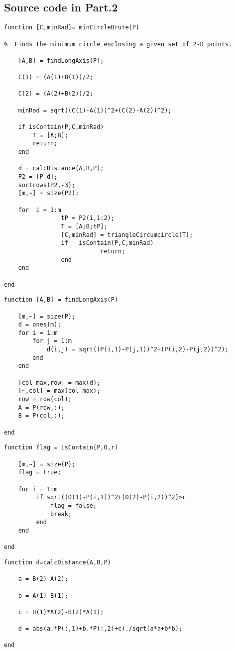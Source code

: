 \documentclass[a4paper, 12pt]{article}
\begin{document}
\subsection{Source code in Part.2}
%
\begin{lstlisting}
function [C,minRad]= minCircleBrute(P)

%  Finds the minimum circle enclosing a given set of 2-D points.

	[A,B] = findLongAxis(P);

	C(1) = (A(1)+B(1))/2;

	C(2) = (A(2)+B(2))/2;

	minRad = sqrt((C(1)-A(1))^2+(C(2)-A(2))^2);

	if isContain(P,C,minRad)
	    T = [A;B];
	    return;
	end

	d = calcDistance(A,B,P);
	P2 = [P d];
	sortrows(P2,-3);
	[m,~] = size(P2);

	for  i = 1:m
	            tP = P2(i,1:2);
	            T = [A;B;tP];
	            [C,minRad] = triangleCircumcircle(T);
	            if   isContain(P,C,minRad)
	                       return;
	            end
	end

end
\end{lstlisting}

\begin{lstlisting}
function [A,B] = findLongAxis(P)

    [m,~] = size(P);
    d = ones(m);
    for i = 1:m
        for j = 1:m
            d(i,j) = sqrt((P(i,1)-P(j,1))^2+(P(i,2)-P(j,2))^2);
        end
    end

    [col_max,row] = max(d);
    [~,col] = max(col_max);
    row = row(col);
    A = P(row,:);
    B = P(col,:);

end
\end{lstlisting}

\begin{lstlisting}
function flag = isContain(P,O,r)

	[m,~] = size(P);
	flag = true;

	for i = 1:m
		 if sqrt((O(1)-P(i,1))^2+(O(2)-P(i,2))^2)>r
		     flag = false;
		     break;
		 end
	end

end
\end{lstlisting}

\begin{lstlisting}
function d=calcDistance(A,B,P)

	a = B(2)-A(2);

	b = A(1)-B(1);

	c = B(1)*A(2)-B(2)*A(1);

	d = abs(a.*P(:,1)+b.*P(:,2)+c)./sqrt(a*a+b*b);

end
\end{lstlisting}
\end{document}
